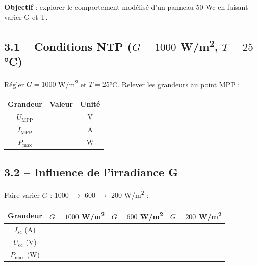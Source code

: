 \documentclass[a4paper, 11pt, oneside]{article}
\begin{document}
\textbf{Objectif} : explorer le comportement modélisé d'un panneau 50 Wc en faisant varier G et T.

\vspace{0.6cm}

\subsection*{3.1 -- Conditions NTP ($G = 1000$ W/m\textsuperscript{2}, $T = 25$°C)}

\begin{tcolorbox}[colback=teal!10, colframe=teal]
Régler $G = 1000$ W/m\textsuperscript{2} et $T = 25$°C. Relever les grandeurs au point MPP :

\vspace{0.4cm}
\begin{tabular}{|c|c|c|}
\hline
\textbf{Grandeur} & \textbf{Valeur} & \textbf{Unité} \\
\hline
$U_{\text{MPP}}$ & \underline{\hspace{3cm}} & V \\[8pt]
\hline
$I_{\text{MPP}}$ & \underline{\hspace{3cm}} & A \\[8pt]
\hline
$P_{\max}$ & \underline{\hspace{3cm}} & W \\[8pt]
\hline
\end{tabular}
\end{tcolorbox}

\vspace{0.8cm}

\subsection*{3.2 -- Influence de l'irradiance G}

\begin{tcolorbox}[colback=teal!10, colframe=teal]
Faire varier $G$ : 1000 $\rightarrow$ 600 $\rightarrow$ 200 W/m\textsuperscript{2} :

\vspace{0.4cm}
\begin{tabular}{|c|c|c|c|}
\hline
\textbf{Grandeur} & $G = 1000$ W/m\textsuperscript{2} & $G = 600$ W/m\textsuperscript{2} & $G = 200$ W/m\textsuperscript{2} \\
\hline
$I_{\text{sc}}$ (A) & \underline{\hspace{2cm}} & \underline{\hspace{2cm}} & \underline{\hspace{2cm}} \\[8pt]
\hline
$U_{\text{oc}}$ (V) & \underline{\hspace{2cm}} & \underline{\hspace{2cm}} & \underline{\hspace{2cm}} \\[8pt]
\hline
$P_{\max}$ (W) & \underline{\hspace{2cm}} & \underline{\hspace{2cm}} & \underline{\hspace{2cm}} \\[8pt]
\hline
\end{tabular}
\end{tcolorbox}
\end{document}
